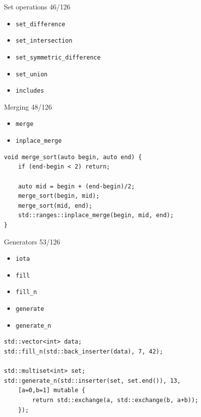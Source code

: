 \documentclass[aspectratio=169]{beamer}
\begin{document}
\begin{frame}{Set operations 46/126}
  \begin{itemize}
    \item{\texttt{set_difference}}
    \item{\texttt{set_intersection}}
    \item{\texttt{set_symmetric_difference}}
    \item{\texttt{set_union}}
    \item{\texttt{includes}}
  \end{itemize}
\end{frame}

\begin{frame}{Merging 48/126}
  \begin{itemize}
    \item{\texttt{merge}}
    \item{\texttt{inplace_merge}}
  \end{itemize}
\end{frame}

\begin{frame}[fragile]{}
\begin{verbatim}
void merge_sort(auto begin, auto end) {
    if (end-begin < 2) return;

    auto mid = begin + (end-begin)/2;
    merge_sort(begin, mid);
    merge_sort(mid, end);
    std::ranges::inplace_merge(begin, mid, end);
}
\end{verbatim}
\end{frame}

\begin{frame}{Generators 53/126}
  \begin{itemize}
    \item{\texttt{iota}}
    \item{\texttt{fill}}
    \item{\texttt{fill_n}}
    \item{\texttt{generate}}
    \item{\texttt{generate_n}}
  \end{itemize}
\end{frame}

\begin{frame}[fragile]{}
\begin{verbatim}
std::vector<int> data;
std::fill_n(std::back_inserter(data), 7, 42);

std::multiset<int> set;
std::generate_n(std::inserter(set, set.end()), 13,
    [a=0,b=1] mutable {
        return std::exchange(a, std::exchange(b, a+b));
    });
\end{verbatim}
\end{frame}
\end{document}
